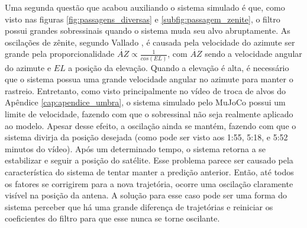 Uma segunda questão que acabou auxiliando o sistema simulado é que, como visto nas figuras \ref{fig:passagens_diversas} e \ref{subfig:passagem_zenite}, o filtro possui grandes sobressinais quando o sistema muda seu alvo abruptamente.
As oscilações de zênite, segundo Vallado \citeyear{vallado2013}, é causada pela velocidade do azimute ser grande pela proporcionalidade $\dot{AZ} \propto \frac{1}{cos(EL)}$, com $\dot{AZ}$ sendo a velocidade angular do azimute e $EL$ a posição da elevação.
Quando a elevação é alta, é necessário que o sistema possua uma grande velocidade angular no azimute para manter o rastreio.
Entretanto, como visto principalmente no vídeo de troca de alvos do Apêndice \ref{cap:apendice_umbra}, o sistema simulado pelo MuJoCo possui um limite de velocidade, fazendo com que o sobressinal não seja realmente aplicado ao modelo.
Apesar desse efeito, a oscilação ainda se mantém, fazendo com que o sistema divirja da posição desejada (como pode ser visto aos 1:55, 5:18, e 5:52 minutos do vídeo). Após um determinado tempo, o sistema retorna a se estabilizar e seguir a posição do satélite.
Esse problema parece ser causado pela característica do sistema de tentar manter a predição anterior. Então, até todos os fatores se corrigirem para a nova trajetória, ocorre uma oscilação claramente visível na posição da antena.
A solução para esse caso pode ser uma forma do sistema perceber que há uma grande diferença de trajetórias e reiniciar os coeficientes do filtro para que esse nunca se torne oscilante.

